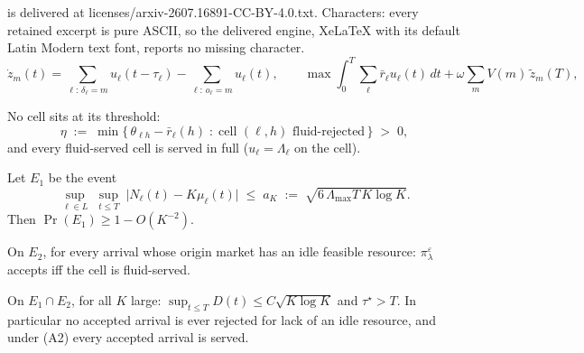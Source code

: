\documentclass[10pt,a4paper]{amsart}
\newcommand{\pol}{\pi_{\lambda}}
\begin{document}
is delivered at licenses/arxiv-2607.16891-CC-BY-4.0.txt. Characters: every retained excerpt is pure ASCII, so the delivered engine, XeLaTeX with its default Latin Modern text font, reports no missing character.
\begin{equation}
  \dot{z}_m(t) = \sum_{\ell:\, \delta_{\ell} = m} u_{\ell}(t - \tau_{\ell})
  - \sum_{\ell:\, o_{\ell} = m} u_{\ell}(t), \qquad
  \max \int_0^T \sum_{\ell} \bar{r}_{\ell} u_{\ell}(t)\, dt
  + \omega \sum_m V(m)\, \tilde{z}_m(T),
  \label{eq:fluid}
\end{equation}

\begin{assumption}
\label{ass:sep}
No cell sits at its threshold:
\begin{equation}
  \eta \;:=\; \min \bigl\{\, \theta_{\ell h} - \bar{r}_{\ell}(h)
  \;:\; \text{cell } (\ell, h) \text{ fluid-rejected} \,\bigr\}
  \;>\; 0,
  \label{eq:margin}
\end{equation}
and every fluid-served cell is served in full
($u_{\ell} = \Lambda_{\ell}$ on the cell).
\end{assumption}

\begin{lemma}
\label{lem:conc}
Let $E_1$ be the event
\begin{equation}
  \sup_{\ell \in L}\; \sup_{t \leq T}\;
  \bigl| N_{\ell}(t) - K \mu_{\ell}(t) \bigr|
  \;\leq\; a_K \;:=\; \sqrt{6\, \Lambda_{\max} T\, K \log K}.
\end{equation}
Then $\Pr(E_1) \geq 1 - O(K^{-2})$.
\end{lemma}

\begin{lemma}
\label{lem:agree}
On $E_2$, for every arrival whose origin market has
an idle feasible resource: $\pol^{\varepsilon}$ accepts iff the cell is
fluid-served.
\end{lemma}

\begin{lemma}
\label{lem:track}
On $E_1 \cap E_2$, for all $K$ large:
$\sup_{t \leq T} D(t) \leq C \sqrt{K \log K}$ and
$\tau^{\star} > T$. In particular no accepted arrival is ever rejected
for lack of an idle resource, and under (A2) every accepted arrival is
served.
\end{lemma}
\end{document}
